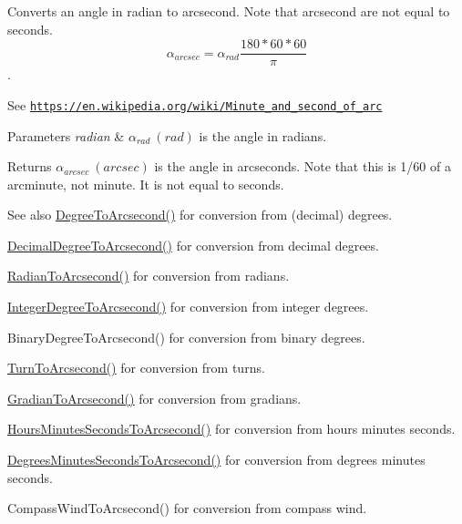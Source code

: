 Converts an angle in radian to arcsecond. Note that arcsecond are not equal to seconds. \[\alpha_{arcsec}=\alpha_{rad}\frac{180 * 60 * 60}{\pi}\]. 

See \href{https://en.wikipedia.org/wiki/Minute_and_second_of_arc}{\tt https\+://en.\+wikipedia.\+org/wiki/\+Minute\+\_\+and\+\_\+second\+\_\+of\+\_\+arc} 
\begin{DoxyParams}{Parameters}
{\em radian} & $\alpha_{rad}\ (rad)$ is the angle in radians. \\
\hline
\end{DoxyParams}
\begin{DoxyReturn}{Returns}
$\alpha_{arcsec}\ (arcsec)$ is the angle in arcseconds. Note that this is 1/60 of a arcminute, not minute. It is not equal to seconds. 
\end{DoxyReturn}
\begin{DoxySeeAlso}{See also}
\mbox{\hyperlink{group___e_g_x_math-_angle_conversions-_degree_gaf85e2d765c248f447854a807a68a5de8}{Degree\+To\+Arcsecond()}} for conversion from (decimal) degrees. 

\mbox{\hyperlink{group___e_g_x_math-_angle_conversions-_decimal_degree_gab9d5635a6e35127b5245978aba508962}{Decimal\+Degree\+To\+Arcsecond()}} for conversion from decimal degrees. 

\mbox{\hyperlink{group___e_g_x_math-_angle_conversions-_radian_ga2f952f6675a0fc54bf72bfe4e3d2664a}{Radian\+To\+Arcsecond()}} for conversion from radians. 

\mbox{\hyperlink{group___e_g_x_math-_angle_conversions-_integer_degree_gaa04058a2fea3dc3678264a05fac6e1ae}{Integer\+Degree\+To\+Arcsecond()}} for conversion from integer degrees. 

Binary\+Degree\+To\+Arcsecond() for conversion from binary degrees. 

\mbox{\hyperlink{group___e_g_x_math-_angle_conversions-_turn_gaad072969abc59ef6f5b63ac6a176a11b}{Turn\+To\+Arcsecond()}} for conversion from turns. 

\mbox{\hyperlink{group___e_g_x_math-_angle_conversions-_gradian_gac768fd444195264165d332f2f5e84d92}{Gradian\+To\+Arcsecond()}} for conversion from gradians. 

\mbox{\hyperlink{group___e_g_x_math-_angle_conversions-_hours_minutes_seconds_ga14620899c81c1f5e65cde96ef4ee626e}{Hours\+Minutes\+Seconds\+To\+Arcsecond()}} for conversion from hours minutes seconds. 

\mbox{\hyperlink{group___e_g_x_math-_angle_conversions-_degrees_minutes_seconds_gabebc8a012be0442c12409a2a71661ed4}{Degrees\+Minutes\+Seconds\+To\+Arcsecond()}} for conversion from degrees minutes seconds. 

Compass\+Wind\+To\+Arcsecond() for conversion from compass wind. 
\end{DoxySeeAlso}
\mbox{\label{group___e_g_x_math-_angle_conversions-_radian_ga13311d9b6977d514f1d6c336e7c0162b}} 
